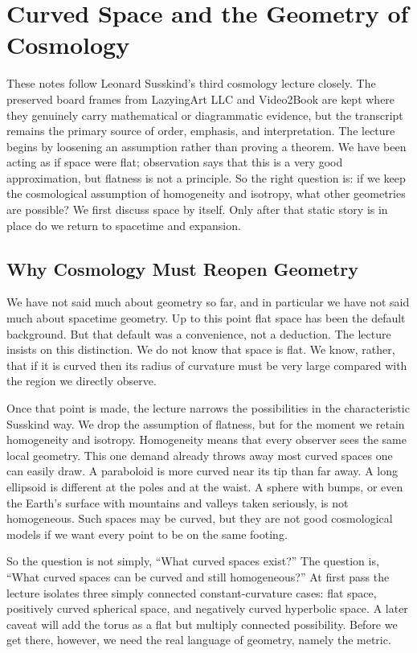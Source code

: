 \chapter{Curved Space and the Geometry of Cosmology}

These notes follow Leonard Susskind's third cosmology lecture closely. The preserved board frames from LazyingArt LLC and Video2Book are kept where they genuinely carry mathematical or diagrammatic evidence, but the transcript remains the primary source of order, emphasis, and interpretation. The lecture begins by loosening an assumption rather than proving a theorem. We have been acting as if space were flat; observation says that this is a very good approximation, but flatness is not a principle. So the right question is: if we keep the cosmological assumption of homogeneity and isotropy, what other geometries are possible? We first discuss space by itself. Only after that static story is in place do we return to spacetime and expansion.

\section{Why Cosmology Must Reopen Geometry}

We have not said much about geometry so far, and in particular we have not said much about spacetime geometry. Up to this point flat space has been the default background. But that default was a convenience, not a deduction. The lecture insists on this distinction. We do not know that space is flat. We know, rather, that if it is curved then its radius of curvature must be very large compared with the region we directly observe.

Once that point is made, the lecture narrows the possibilities in the characteristic Susskind way. We drop the assumption of flatness, but for the moment we retain homogeneity and isotropy. Homogeneity means that every observer sees the same local geometry. This one demand already throws away most curved spaces one can easily draw. A paraboloid is more curved near its tip than far away. A long ellipsoid is different at the poles and at the waist. A sphere with bumps, or even the Earth's surface with mountains and valleys taken seriously, is not homogeneous. Such spaces may be curved, but they are not good cosmological models if we want every point to be on the same footing.

So the question is not simply, ``What curved spaces exist?'' The question is, ``What curved spaces can be curved and still homogeneous?'' At first pass the lecture isolates three simply connected constant-curvature cases: flat space, positively curved spherical space, and negatively curved hyperbolic space. A later caveat will add the torus as a flat but multiply connected possibility. Before we get there, however, we need the real language of geometry, namely the metric.

